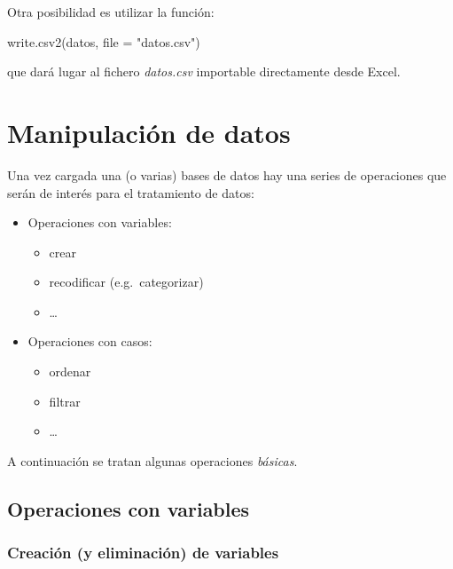 \documentclass[
]{book}
\newenvironment{Shaded}{\begin{snugshade}}{\end{snugshade}}
\newcommand{\AttributeTok}[1]{\textcolor[rgb]{0.77,0.63,0.00}{#1}}
\newcommand{\FunctionTok}[1]{\textcolor[rgb]{0.00,0.00,0.00}{#1}}
\newcommand{\NormalTok}[1]{#1}
\newcommand{\StringTok}[1]{\textcolor[rgb]{0.31,0.60,0.02}{#1}}
\providecommand{\tightlist}{%
  \setlength{\itemsep}{0pt}\setlength{\parskip}{0pt}}
\theoremstyle{break}
\theoremstyle{nonumberplain}
\begin{document}
Otra posibilidad es utilizar la función:

\begin{Shaded}
\begin{Highlighting}[]
\FunctionTok{write.csv2}\NormalTok{(datos, }\AttributeTok{file =} \StringTok{"datos.csv"}\NormalTok{)}
\end{Highlighting}
\end{Shaded}

que dará lugar al fichero \emph{datos.csv} importable directamente desde Excel.

\hypertarget{manipulaciuxf3n-de-datos}{%
\section{Manipulación de datos}\label{manipulaciuxf3n-de-datos}}

Una vez cargada una (o varias) bases
de datos hay una series de operaciones que serán de interés para el
tratamiento de datos:

\begin{itemize}
\tightlist
\item
  Operaciones con variables:

  \begin{itemize}
  \tightlist
  \item
    crear
  \item
    recodificar (e.g.~categorizar)
  \item
    \ldots{}
  \end{itemize}
\item
  Operaciones con casos:

  \begin{itemize}
  \tightlist
  \item
    ordenar
  \item
    filtrar
  \item
    \ldots{}
  \end{itemize}
\end{itemize}

A continuación se tratan algunas operaciones \emph{básicas}.

\hypertarget{operaciones-con-variables}{%
\subsection{Operaciones con variables}\label{operaciones-con-variables}}

\hypertarget{creaciuxf3n-y-eliminaciuxf3n-de-variables}{%
\subsubsection{Creación (y eliminación) de variables}\label{creaciuxf3n-y-eliminaciuxf3n-de-variables}}
\end{document}

